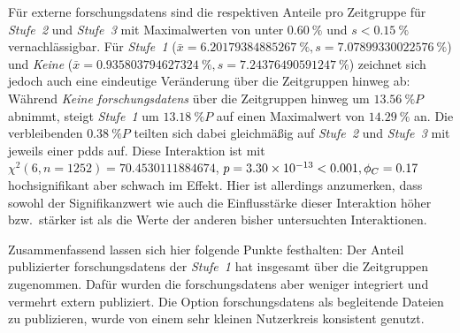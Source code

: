 Für externe \glspl{forschungsdaten} sind die respektiven Anteile pro Zeitgruppe für \textit{Stufe~2} und \textit{Stufe~3} mit Maximalwerten von unter $\SI{0,60}{\percent}$ und $s<\SI{0,15}{\percent}$ vernachlässigbar.
Für \textit{Stufe~1} ($\bar{x}=\SI[round-mode=places,round-precision=2]{6.20179384885267}{\percent},s=\SI[round-mode=places,round-precision=2]{7.07899330022576}{\percent}$) und \textit{Keine} ($\bar{x}=\SI[round-mode=places,round-precision=2]{0.935803794627324}{\percent},s=\SI[round-mode=places,round-precision=2]{7.24376490591247}{\percent}$) zeichnet sich jedoch auch eine eindeutige Veränderung über die Zeitgruppen hinweg ab:
Während \textit{Keine \glspl{forschungsdaten}} über die Zeitgruppen hinweg um $\SI[round-mode=places,round-precision=2]{13.56}{\percent P}$ abnimmt, steigt \textit{Stufe~1} um $\SI[round-mode=places,round-precision=2]{13.18}{\percent P}$ auf einen Maximalwert von $\SI[round-mode=places,round-precision=2]{14.29}{\percent}$ an.
Die verbleibenden $\SI[round-mode=places,round-precision=2]{0.38}{\percent P}$ teilten sich dabei gleichmäßig auf \textit{Stufe~2} und \textit{Stufe~3} mit jeweils einer \glspl{pdd} auf.
Diese Interaktion ist mit $\chi^2 (\num{6}, n=\num{1252}) = \num[round-mode=places,round-precision=2]{70.4530111884674}$, $p = \num[round-mode=places,round-precision=2]{3.3012369430121E-13}<\num{0.001},\phi_C=\num[round-mode=places,round-precision=2]{0.167738446925158}$ hochsignifikant aber schwach im Effekt.
Hier ist allerdings anzumerken, dass sowohl der Signifikanzwert wie auch die Einflusstärke dieser Interaktion höher bzw.~stärker ist als die Werte der anderen bisher untersuchten Interaktionen.

Zusammenfassend lassen sich hier folgende Punkte festhalten:
Der Anteil publizierter \glspl{forschungsdaten} der \textit{Stufe~1} hat insgesamt über die Zeitgruppen zugenommen.
Dafür wurden die \glspl{forschungsdaten} aber weniger integriert und vermehrt extern publiziert.
Die Option \glspl{forschungsdaten} als begleitende Dateien zu publizieren, wurde von einem sehr kleinen Nutzerkreis konsistent genutzt.

